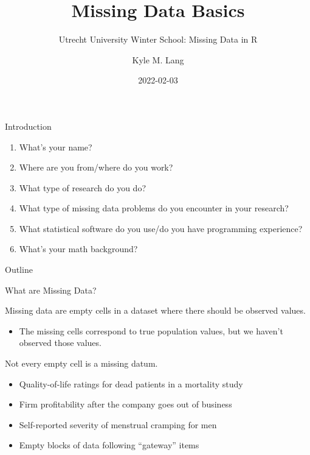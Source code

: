 \documentclass{beamer}\usepackage[]{graphicx}\usepackage[]{color}
\title{Missing Data Basics}
\subtitle{Utrecht University Winter School: Missing Data in R}
\author{Kyle M. Lang}
\institute{Department of Methodology \& Statistics\\Utrecht University}
\date{2022-02-03}
\begin{document}

\begin{frame}[t, plain]
  \titlepage
\end{frame}


\begin{frame}{Introduction}

  \begin{enumerate}
  \item What's your name?
    \vc
  \item Where are you from/where do you work?
    \vc
  \item What type of research do you do?
    \vc
  \item What type of missing data problems do you encounter in your research?
    \vc
  \item What statistical software do you use/do you have programming experience?
    \vc
  \item What's your math background?
  \end{enumerate}

\end{frame}


\begin{frame}{Outline}
  \tableofcontents
\end{frame}


\begin{frame}{What are Missing Data?}

  Missing data are empty cells in a dataset where there should be observed
  values.
  \vc
  \begin{itemize}
  \item The missing cells correspond to true population values, but we haven't
    observed those values.
  \end{itemize}
  \vb
  \pause
  Not every empty cell is a missing datum.
  \vc
  \begin{itemize}
  \item Quality-of-life ratings for dead patients in a mortality study
    \vc
  \item Firm profitability after the company goes out of business
    \vc
  \item Self-reported severity of menstrual cramping for men
    \vc
  \item Empty blocks of data following ``gateway'' items
  \end{itemize}

\end{frame}
\end{document}
